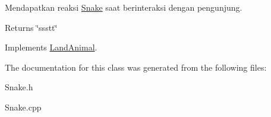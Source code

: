 Mendapatkan reaksi \hyperlink{classSnake}{Snake} saat berinteraksi dengan pengunjung. 

\begin{DoxyReturn}{Returns}
\char`\"{}ssstt\char`\"{} 
\end{DoxyReturn}


Implements \hyperlink{classLandAnimal}{Land\-Animal}.



The documentation for this class was generated from the following files\-:\begin{DoxyCompactItemize}
\item 
Snake.\-h\item 
Snake.\-cpp\end{DoxyCompactItemize}
